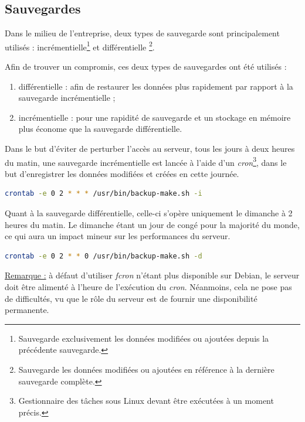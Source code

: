 \subsection{Sauvegardes}
\label{subsec:sauvegardes}

Dans le milieu de l'entreprise, deux types de sauvegarde sont principalement
utilisés : incrémentielle\footnote{Sauvegarde exclusivement les données
modifiées ou ajoutées depuis la précédente sauvegarde.} et différentielle
\footnote{Sauvegarde les données modifiées ou ajoutées en référence à la
dernière sauvegarde complète.}.

Afin de trouver un compromis, ces deux types de sauvegardes ont été utilisés :

\begin{enumerate}
\item différentielle : afin de restaurer les données plus rapidement par rapport
  à la sauvegarde incrémentielle ;

\item incrémentielle : pour une rapidité de sauvegarde et un stockage en mémoire
plus économe que la sauvegarde différentielle.
\end{enumerate}

Dans le but d'éviter de perturber l'accès au serveur, tous les jours à deux heures du matin, une
sauvegarde incrémentielle est lancée à l'aide d'un
\emph{cron}\footnote{Gestionnaire des tâches sous Linux devant être exécutées à
un moment précis.}, dans le but d'enregistrer les données modifiées et créées en
cette journée.

\begin{lstlisting}[language=bash]
crontab -e 0 2 * * * /usr/bin/backup-make.sh -i
\end{lstlisting}

Quant à la sauvegarde différentielle, celle-ci s'opère uniquement le dimanche à
2 heures du matin. Le dimanche étant un jour de congé pour la majorité du monde,
ce qui aura un impact mineur sur les performances du serveur.

\begin{lstlisting}[language=bash]
crontab -e 0 2 * * 0 /usr/bin/backup-make.sh -d
\end{lstlisting}

\underline{Remarque :} à défaut d'utiliser \textit{fcron} n'étant plus
disponible sur Debian, le serveur doit être alimenté à l'heure de l'exécution du
\textit{cron}. Néanmoins, cela ne pose pas de difficultés, vu que le rôle du
serveur est de fournir une disponibilité permanente.

